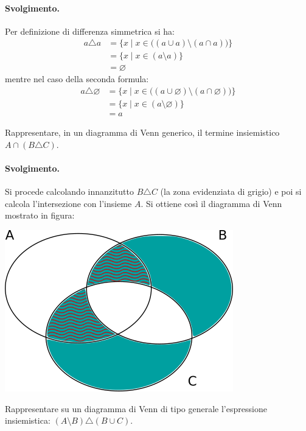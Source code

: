 \paragraph{Svolgimento.} Per definizione di differenza simmetrica si ha:
\begin{align*}
	a \triangle a &= \{ x \; | \; x \in \bigl(( a \cup a) \setminus (a \cap a)\bigr) \}  \\
	&= \{x \; | \; x \in (a \setminus a) \} \\
	&= \varnothing
\end{align*}
mentre nel caso della seconda formula:
\begin{align*}
	a \triangle \varnothing &= \{ x \; | \; x \in \bigl(( a \cup \varnothing ) \setminus (a \cap \varnothing)\bigr) \} \\
	&= \{x \; | \; x \in (a \setminus \varnothing ) \} \\
	&= a
\end{align*}
\hfill \blacksquare

\begin{exsbox}
	Rappresentare, in un diagramma di Venn generico, il termine insiemistico $A \cap ( B \triangle C)$.
\end{exsbox}
\paragraph{Svolgimento. }Si procede calcolando innanzitutto $B \triangle C$ (la zona evidenziata di grigio) e poi si calcola l'intersezione con l'insieme $A$. Si ottiene così il diagramma di Venn mostrato in figura:
\begin{center}
	\includegraphics[scale=.6]{res/Venn_Esercizio2.png}
\end{center}
\hfill \blacksquare
\begin{exsbox}
	Rappresentare su un diagramma di Venn di tipo generale l'espressione insiemistica:
	$(A \setminus B) \triangle (B \cup C)$.
\end{exsbox}
